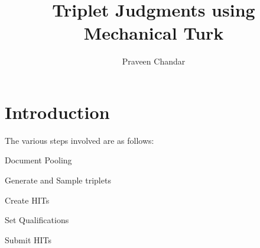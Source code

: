 \documentclass[prodmode,acmtecs]{reports}\usepackage[]{graphicx}\usepackage[]{color}
\begin{document}

\title{Triplet Judgments using Mechanical Turk}
\author{Praveen Chandar
}

\begin{abstract}

\end{abstract}






\maketitle


\section{Introduction}



The various steps involved are as follows:
\begin{bulletlist}
\item Document Pooling 
\item Generate and Sample triplets
\item Create HITs
\item Set Qualifications
\item Submit HITs
\end{bulletlist}
\end{document}
